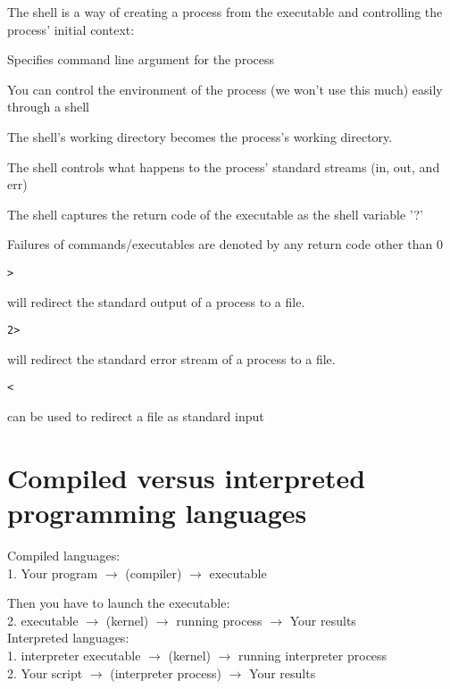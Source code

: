 \documentclass[landscape]{foils}
\begin{document}
\myNewSlide
\normalsize
\begin{compactenum}
	\item The shell is a way of creating a process from the executable and controlling the process' initial context:
	\begin{compactenum}
		\item Specifies command line argument for the process
		\item You can control the environment of the process (we won't use this much) easily through a shell
		\item The shell's working directory becomes the process's working directory.
		\item The shell controls what happens to the process' standard streams (in, out, and err)
		\item The shell captures the return code of the executable as the shell variable '?'
	\end{compactenum}
	\item Failures of commands/executables are denoted by any return code other than 0
	\item \begin{verbatim}>\end{verbatim} will redirect the standard output of a process to a file.
	\item \begin{verbatim}2>\end{verbatim} will redirect the standard error stream of a process to a file.
	\item \begin{verbatim}<\end{verbatim} can be used to redirect a file as standard input
\end{compactenum}

\myNewSlide
\section*{Compiled versus interpreted programming languages}
\large
Compiled languages:\\
1. {\color{red} Your program} $\rightarrow$ (compiler) $\rightarrow$ executable\par
Then you have to launch the executable:\\
2. executable $\rightarrow$ (kernel) $\rightarrow$ running process $\rightarrow$ {\color{red} Your results}\\

Interpreted languages:\\
1. interpreter executable $\rightarrow$ (kernel) $\rightarrow$ running interpreter process\\
2. {\color{red} Your script}  $\rightarrow$ (interpreter process) $\rightarrow$ {\color{red} Your results}
\end{document}
